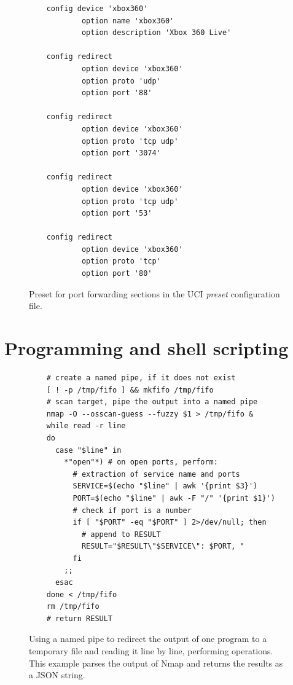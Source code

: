\documentclass[a4paper,11pt,makeidx]{kth-bcs}
\begin{document}
   \begin{figure}[ht]
      \centering
      \begin{lstlisting}
    config device 'xbox360'
            option name 'xbox360'
            option description 'Xbox 360 Live'

    config redirect
            option device 'xbox360'
            option proto 'udp'
            option port '88'

    config redirect
            option device 'xbox360'
            option proto 'tcp udp'
            option port '3074'

    config redirect
            option device 'xbox360'
            option proto 'tcp udp'
            option port '53'

    config redirect
            option device 'xbox360'
            option proto 'tcp'
            option port '80'
      \end{lstlisting}
      \caption{
         \small{
Preset for port forwarding sections in the UCI \emph{preset} configuration file.
         }
      }
      \label{fig:preset_conf}
   \end{figure}

\chapter{Programming and shell scripting}\label{appB}
   \begin{figure}[ht]
      \centering
      \lstset{language=sh}
      \begin{lstlisting}
    # create a named pipe, if it does not exist
    [ ! -p /tmp/fifo ] && mkfifo /tmp/fifo
    # scan target, pipe the output into a named pipe
    nmap -O --osscan-guess --fuzzy $1 > /tmp/fifo &
    while read -r line
    do
      case "$line" in
        *"open"*) # on open ports, perform:
          # extraction of service name and ports
          SERVICE=$(echo "$line" | awk '{print $3}')
          PORT=$(echo "$line" | awk -F "/" '{print $1}')
          # check if port is a number
          if [ "$PORT" -eq "$PORT" ] 2>/dev/null; then
            # append to RESULT
            RESULT="$RESULT\"$SERVICE\": $PORT, "
          fi
        ;;
      esac
    done < /tmp/fifo
    rm /tmp/fifo
    # return RESULT
      \end{lstlisting}
      \caption{
         \small{
Using a named pipe to redirect the output of one program to a temporary file and reading it line by line, performing operations.
This example parses the output of Nmap and returns the results as a JSON string.
         }
      }
      \label{fig:fifo}
   \end{figure}
\end{document}
